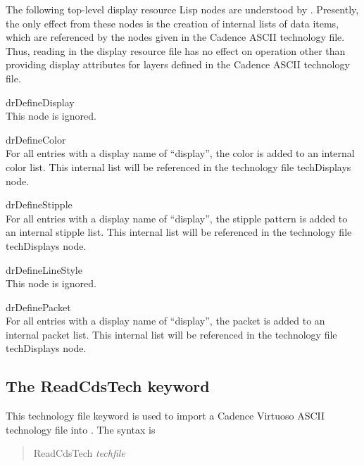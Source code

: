 The following top-level display resource Lisp nodes are understood by
{\Xic}.  Presently, the only effect from these nodes is the creation
of internal lists of data items, which are referenced by the nodes
given in the Cadence ASCII technology file.  Thus, reading in the
display resource file has no effect on {\Xic} operation other than
providing display attributes for layers defined in the Cadence ASCII
technology file.

\begin{description}
\item{\vt drDefineDisplay}\\
This node is ignored.

\item{\vt drDefineColor}\\
For all entries with a display name of ``{\vt display}'', the color is
added to an internal color list.  This internal list will be
referenced in the technology file {\vt techDisplays} node.

\item{\vt drDefineStipple}\\
For all entries with a display name of ``{\vt display}'', the stipple
pattern is added to an internal stipple list.  This internal list will
be referenced in the technology file {\vt techDisplays} node. 

\item{\vt drDefineLineStyle}\\
This node is ignored.

\item{\vt drDefinePacket}\\
For all entries with a display name of ``{\vt display}'', the packet
is added to an internal packet list.  This internal list will be
referenced in the technology file {\vt techDisplays} node.
\end{description}

\subsection{The {\vt ReadCdsTech} keyword}

This technology file keyword is used to import a Cadence Virtuoso
ASCII technology file into {\Xic}.  The syntax is
\begin{quote}
{\vt ReadCdsTech} {\it techfile}
\end{quote}

